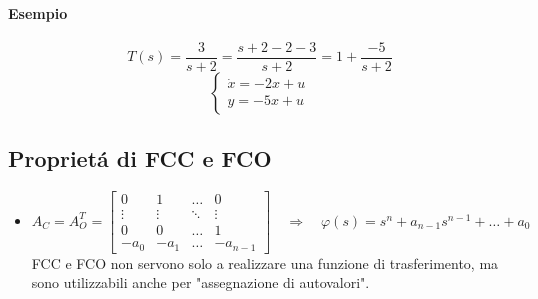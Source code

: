 \documentclass[../main.tex]{subfiles}
\begin{document}
		\begin{mdframed}[style=Esempio]
			\paragraph{Esempio}
				\[
					T(s) = \dfrac{3}{s+2} = \dfrac{s+2-2-3}{s+2} = 1+\dfrac{-5}{s+2}
				\]
				\[
					\begin{cases}
						\dot x = -2x + u\\
						y = -5x + u
					\end{cases}
				\]
		\end{mdframed}
		
	\subsection{Propriet\'a di FCC e FCO}
		\begin{itemize}
			\item 
				\[
					A_C = A_O^T =
					\begin{bmatrix}
						0 & 1 & \dots & 0\\
						\vdots & \vdots & \ddots & \vdots\\
						0 & 0 & \dots & 1\\
						-a_0 & -a_1 & \dots & -a_{n-1}
					\end{bmatrix}
					\quad\Rightarrow\quad
					\varphi(s) = s^n + a_{n-1} s^{n-1} + \ldots + a_0
				\]
				FCC e FCO non servono solo a realizzare una funzione di trasferimento, ma sono utilizzabili anche per "assegnazione di autovalori".
				
				\begin{mdframed}[style=Esempio]

\end{mdframed}
\end{itemize}
\end{document}
